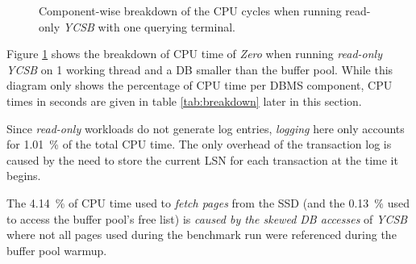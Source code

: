 \begin{@empty}
\begin{figure}[h!]
        \caption[CPU cycles breakdown for single-threaded read-only YCSB]{Component-wise breakdown of the CPU cycles when running read-only \textit{YCSB} with one querying terminal.}
        \label{fig:cyclesycsbread1}
    \end{figure}
\end{@empty}

    Figure \ref{fig:cyclesycsbread1} shows the breakdown of CPU time of \textit{Zero} when running \emph{read-only} \textit{YCSB} on 1 working thread and a DB smaller than the buffer pool. While this diagram only shows the percentage of CPU time per DBMS component, CPU times in seconds are given in table \ref{tab:breakdown} later in this section.

    Since \emph{read-only} workloads do not generate log entries, \emph{logging} here only accounts for \SI{1.01}{\percent} of the total CPU time. The only overhead of the transaction log is caused by the need to store the current LSN for each transaction at the time it begins.

    The \SI{4.14}{\percent} of CPU time used to \emph{fetch pages} from the SSD (and the \SI{0.13}{\percent} used to access the buffer pool's free list) is \emph{caused by the skewed DB accesses} of \textit{YCSB} where not all pages used during the benchmark run were referenced during the buffer pool warmup.

